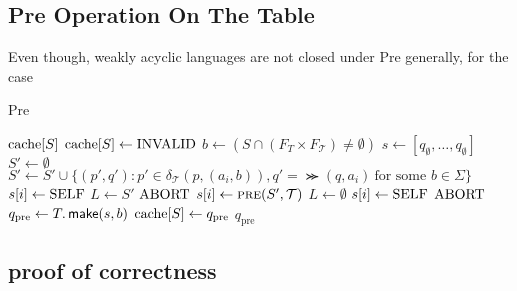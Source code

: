 \subsection{Pre Operation On The Table}
Even though, weakly acyclic languages are not closed under Pre generally, for the case 

\begin{algorithm}
\caption{Pre}\label{alg:pre}
\begin{algorithmic}[1]
\If{$\cache[S]$}
\Return $\cache[S]$
\EndIf
\State $\cache[S] \gets \invalid$
\State $b \gets (S \cap (F_{T} \times F_{\mathcal{T}}) \neq \emptyset)$
\State $s \gets [q_{\emptyset},\dots,q_{\emptyset}]$
\State $S' \gets \emptyset$
\State $S' \gets S' \cup \{ (p',q'): p' \in \delta_{\mathcal{T}}(p,(a_{i},b)), q'=\Succ(q,a_{i}) \ \text{for some $b \in \Sigma$} \}$
\EndFor
{}
\State $s[i] \gets \mathrm{SELF}$
\State $L \gets S'$
\Return $\mathrm{ABORT}$
\Else
\State $s[i] \gets \Call{pre}{S',\mathcal{T}}$
\State $L \gets \emptyset$
\State $s[i] \gets \mathrm{SELF}$
\Else
\Return $\mathrm{ABORT}$
\EndIf 
\EndIf
\EndIf
\EndFor
\State $q_{\text{pre}} \gets T.\operatorname{\textsf{make}}(s,b)$
\State $\mathrm{cache}[S] \gets q_{\text{pre}}$
\Return $q_{\text{pre}} $
\EndProcedure
\end{algorithmic}
\end{algorithm}

\subsection{proof of correctness}

